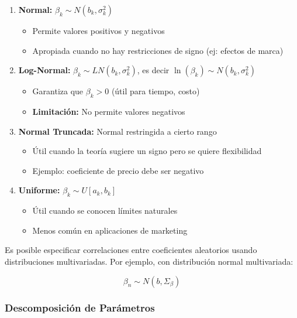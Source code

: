 \documentclass[
]{book}
\providecommand{\tightlist}{%
  \setlength{\itemsep}{0pt}\setlength{\parskip}{0pt}}
\begin{document}
\begin{enumerate}
\def\labelenumi{\arabic{enumi}.}
\tightlist
\item
  \textbf{Normal:} \(\beta_k \sim N(b_k, \sigma^2_k)\)

  \begin{itemize}
  \tightlist
  \item
    Permite valores positivos y negativos
  \item
    Apropiada cuando no hay restricciones de signo (ej: efectos de marca)
  \end{itemize}
\item
  \textbf{Log-Normal:} \(\beta_k \sim LN(b_k, \sigma^2_k)\), es decir \(\ln(\beta_k) \sim N(b_k, \sigma^2_k)\)

  \begin{itemize}
  \tightlist
  \item
    Garantiza que \(\beta_k > 0\) (útil para tiempo, costo)
  \item
    \textbf{Limitación:} No permite valores negativos
  \end{itemize}
\item
  \textbf{Normal Truncada:} Normal restringida a cierto rango

  \begin{itemize}
  \tightlist
  \item
    Útil cuando la teoría sugiere un signo pero se quiere flexibilidad
  \item
    Ejemplo: coeficiente de precio debe ser negativo
  \end{itemize}
\item
  \textbf{Uniforme:} \(\beta_k \sim U[a_k, b_k]\)

  \begin{itemize}
  \tightlist
  \item
    Útil cuando se conocen límites naturales
  \item
    Menos común en aplicaciones de marketing
  \end{itemize}
\end{enumerate}

Es posible especificar correlaciones entre coeficientes aleatorios usando distribuciones multivariadas. Por ejemplo, con distribución normal multivariada:

\[\beta_n \sim N(b, \Sigma_\beta)\]

\subsubsection{Descomposición de Parámetros}\label{descomposiciuxf3n-de-paruxe1metros}
\end{document}
